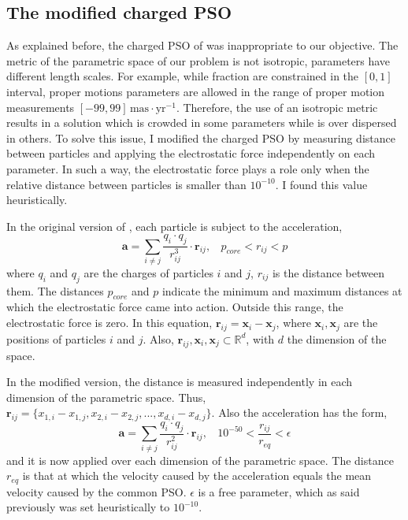 \subsection{The modified charged PSO}
\label{sect:chargedPSO}
As explained before, the charged PSO of \citet{Blackwell2002} was inappropriate to our objective. The metric of the parametric space of our problem is not isotropic, parameters have different length scales. For example, while fraction are constrained in the $[0,1]$ interval, proper motions parameters are allowed in the range of proper motion measurements $[-99,99]\,\mathrm{mas\cdot yr^{-1}}$. Therefore, the use of an isotropic metric results in a solution which is crowded in some parameters while is over dispersed in others. 
To solve this issue, I modified the charged PSO by measuring distance between particles and applying the electrostatic force independently on each parameter. In such a way, the electrostatic force plays a role only when the relative distance between particles is smaller than $10^{-10}$. I found this value heuristically.

In the original version of  \citet{Blackwell2002}, each particle is subject to the acceleration,
\begin{equation}
\label{eq:PSOacc}
\mathbf{a}=\sum_{i\neq j} \frac{q_i \cdot q_j }{r_{ij}^3} \cdot \mathbf{r}_{ij}, \ \ \ \ p_{core} < r_{ij} < p
\end{equation}
where $q_i$ and $q_j$ are the charges of particles $i$ and $j$, $r_{ij}$ is the distance between them. The distances $p_{core}$ and $p$ indicate the minimum and maximum distances at which the electrostatic force came into action. Outside this range, the electrostatic force is zero. In this equation, $\mathbf{r}_{ij}= \mathbf{x}_i -\mathbf{x}_j$, where $\mathbf{x}_i,\mathbf{x}_j$ are the positions of particles $i$ and $j$. Also, $\mathbf{r}_{ij},\mathbf{x}_i,\mathbf{x}_j \subset \mathbb{R}^d$, with $d$ the dimension of the space. 

In the modified version, the distance is measured independently in each dimension of the parametric space. Thus, $\mathbf{r}_{ij}= \{x_{1,i} -x_{1,j},x_{2,i} -x_{2,j},...,x_{d,i} -x_{d,j}\}$. Also the acceleration has the form,
\begin{equation}
\label{eq:PSOacc}
\mathbf{a}=\sum_{i\neq j} \frac{q_i \cdot q_j }{r_{ij}^2} \cdot \mathbf{r}_{ij}, \ \ \ \  10^{-50} < \frac{r_{ij}}{r_{eq}} < \epsilon
\end{equation}
and it is now applied over each dimension of the parametric space. The distance $r_{eq}$ is that at which the velocity caused by the acceleration equals the mean velocity caused by the common PSO. $\epsilon$ is a free parameter, which as said previously was set heuristically to $10^{-10}$.

